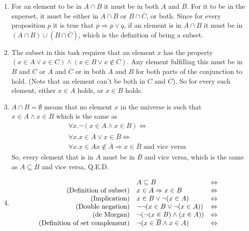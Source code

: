 \documentclass{article}
\begin{document}
\begin{enumerate}
\begin{enumerate}
            \item For an element to be in $A \cap B$ it must be in both $A$ and $B$. For it to be in the superset, it must be either in $A\cap B$ or $B \cap \overline{C}$, or both. Since for every proposition $p$ it is true that $p \Rightarrow p \lor q$, if an element is in $A \cap B$ it must be in $(A \cap B) \cup (B \cap \overline{C})$, which is the definition of being a subset.
            \item The subset in this task requires that an element $x$ has the property $(x \in A \lor x \in C) \land (x \in B \lor x \not\in C)$. Any element fulfilling this must be in $B$ and $C$ or $A$ and $\overline{C}$ or in both $A$ and $B$ for both parts of the conjunction to hold. (Note that an element can't be both in $C$ and $\overline{C}$). So for every such element, either $x \in A$ holds, or $x \in B$ holds. 
            \item $A \cap B = \emptyset$ means that no element $x$ in the universe is such that $x \in A \land x \in B$ which is the same as
                \begin{align*}
                    \forall x . \lnot (x \in A \land x \in B) \Leftrightarrow \\
                \forall x . x \in \overline{A} \lor x \in \overline{B} \Leftrightarrow \\
                \forall x . x \in A x \not\in \overline{A} \Rightarrow x \in \overline{B} \text{ and vice versa }
                \end{align*}
                So, every element that is in $A$ must be in $\overline{B}$ and vice versa, which is the same as $A \subseteq \overline{B}$ and vice versa, Q.E.D.
            \item
                $$\begin{array}{r l l}
                    &A \subseteq B &\Leftrightarrow \\
                    \text{(Definition of subset)} &x \in A \Rightarrow x \in B &\Leftrightarrow\\
                    \text{(Implication)} &x \in B \lor \lnot(x \in A) &\Leftrightarrow \\
                    \text{(Double negation)} &\lnot\lnot(x \in B \lor \lnot(x \in A)) &\Leftrightarrow \\
                    \text{(de Morgan)} &\lnot(\lnot(x \in B) \land (x \in A)) & \Leftrightarrow \\
                    \text{(Definition of set complement)} &\lnot(x \in \overline{B} \land x \in A) & \Leftrightarrow \\

\end{array}$$
\end{enumerate}
\end{enumerate}
\end{document}
